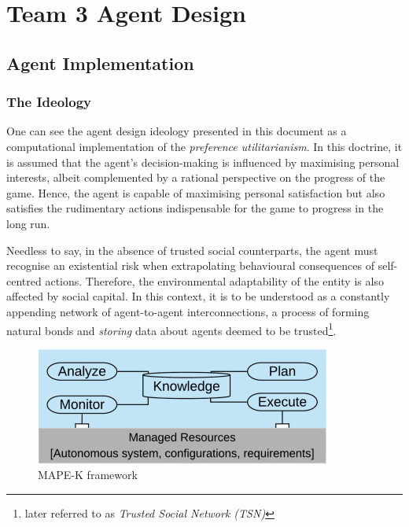 \chapter{Team 3 Agent Design}\label{team_3_agent_design}

\section{Agent Implementation}
    
    \subsection{The Ideology}

        One can see the agent design ideology presented in this document as a computational implementation of the \textit{preference utilitarianism}. In this doctrine, it is assumed that the agent's decision-making is influenced by maximising personal interests, albeit complemented by a rational perspective on the progress of the game. Hence, the agent is capable of maximising personal satisfaction but also satisfies the rudimentary actions indispensable for the game to progress in the long run. \cite{pitt}
        
        Needless to say, in the absence of trusted social counterparts, the agent must recognise an existential risk when extrapolating behavioural consequences of self-centred actions. Therefore, the environmental adaptability of the entity is also affected by social capital. In this context, it is to be understood as a constantly appending network of agent-to-agent interconnections, a process of forming natural bonds and \textit{storing} data about agents deemed to be trusted\footnote{later referred to as \textit{Trusted Social Network (TSN)}}.

        \begin{figure}[H]
            \centering
            \includegraphics{006_team_3_agent_design/FIGS/mapek.jpg}
            \caption{MAPE-K framework}
            \label{fig:mapek_framework}
        \end{figure}


